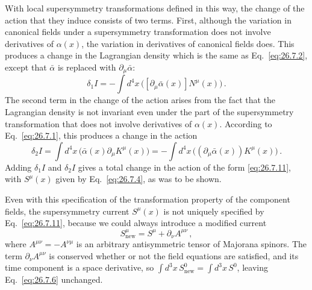 With local supersymmetry transformations defined in this way, the change of
the action that they induce consists of two terms. First, although the
variation in canonical fields under a supersymmetry transformation does not
involve derivatives of \(\alpha(x)\), the variation in derivatives of
canonical fields does. This produces a change in the Lagrangian density which
is the same as Eq.~\eqref{eq:26.7.2}, except that \(\bar\alpha\) is replaced
with \(\partial_\mu\bar\alpha\):
\[
  \delta_1 I
  =-\int d^4x\,\bigl([\partial_\mu\bar\alpha(x)]N^\mu(x)\bigr)\,.
\]
The second term in the change of the action arises from the fact that the
Lagrangian density is not invariant even under the part of the supersymmetry
transformation that does not involve derivatives of \(\alpha(x)\). According
to Eq.~\eqref{eq:26.7.1}, this produces a change in the action
\[
  \delta_2 I
  =\int d^4x\,\bigl(\bar\alpha(x)\partial_\mu K^\mu(x)\bigr)
  =-\int d^4x\,\bigl((\partial_\mu\bar\alpha(x))K^\mu(x)\bigr)\,.
\]
Adding \(\delta_1 I\) and \(\delta_2 I\) gives a total change in the action of
the form \eqref{eq:26.7.11}, with \(S^\mu(x)\) given by
Eq.~\eqref{eq:26.7.4}, as was to be shown.

Even with this specification of the transformation property of the component
fields, the supersymmetry current \(S^\mu(x)\) is not uniquely specified by
Eq.~\eqref{eq:26.7.11}, because we could always introduce a modified current
\begin{equation}
  S_{\mathrm{new}}^\mu=S^\mu+\partial_\nu A^{\mu\nu}\,,
  \tag{26.7.16}\label{eq:26.7.16}
\end{equation}
where \(A^{\mu\nu}=-A^{\nu\mu}\) is an arbitrary antisymmetric tensor of
Majorana spinors. The term \(\partial_\nu A^{\mu\nu}\) is conserved whether
or not the field equations are satisfied, and its time component is a space
derivative, so \(\int d^3x\,S_{\mathrm{new}}^0=\int d^3x\,S^0\), leaving
Eq.~\eqref{eq:26.7.6} unchanged.

